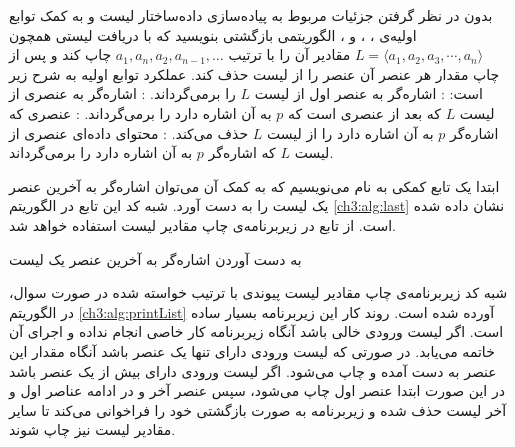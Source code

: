 



 بدون در نظر گرفتن جزئیات مربوط به پیاده‌سازی داده‌ساختار لیست و به کمک توابع اولیه‌ی {}،  {}، {} و {}، الگوریتمی بازگشتی بنویسید که با دریافت لیستی همچون {$L=\langle a_1,a_2,a_3,\cdots,a_n\rangle$} مقادیر آن را با ترتیب {$a_1,a_n,a_2,a_{n-1},\ldots$} چاپ کند و پس از چاپ مقدار هر عنصر آن عنصر را از لیست حذف کند. عملکرد توابع اولیه به شرح زیر است:
: اشاره‌گر به عنصر اول از لیست {$L$} را برمی‌گرداند.
: اشاره‌گر به عنصری از لیست {$L$} که بعد از عنصری است که {$p$} به آن اشاره دارد را برمی‌گرداند.
: عنصری که اشاره‌گر {$p$} به آن اشاره دارد را از لیست {$L$} حذف می‌کند.
: محتوای داده‌ای عنصری از لیست {$L$} که اشاره‌گر {$p$} به آن اشاره دارد را برمی‌گرداند.


ابتدا یک تابع کمکی به نام {} می‌نویسیم که به کمک آن می‌توان اشاره‌گر به آخرین عنصر یک لیست را به دست آورد. شبه کد این  تابع در الگوریتم {\eqref{ch3:alg:last}} نشان داده شده است. از تابع {} در زیربرنامه‌ی چاپ مقادیر لیست استفاده خواهد شد.

\begin{algorithm}
\caption{به دست آوردن اشاره‌گر به آخرین عنصر یک لیست}\label{ch3:alg:last}
\begin{latin}
\end{latin}
\end{algorithm}

شبه کد زیربرنامه‌ی چاپ مقادیر لیست پیوندی با ترتیب خواسته شده در صورت سوال، در الگوریتم {\eqref{ch3:alg:printList}} آورده شده است. روند کار این زیربرنامه بسیار ساده است. اگر لیست ورودی خالی باشد آنگاه زیربرنامه کار خاصی انجام نداده و اجرای آن خاتمه می‌یابد.  در صورتی که لیست ورودی دارای تنها یک عنصر باشد آنگاه مقدار این عنصر به دست آمده و چاپ می‌شود. اگر لیست ورودی دارای بیش از یک عنصر باشد در این صورت ابتدا عنصر اول چاپ می‌شود، سپس عنصر آخر و در ادامه عناصر اول و آخر لیست حذف شده و زیربرنامه به صورت بازگشتی خود را فراخوانی می‌کند تا سایر مقادیر لیست نیز چاپ شوند.

